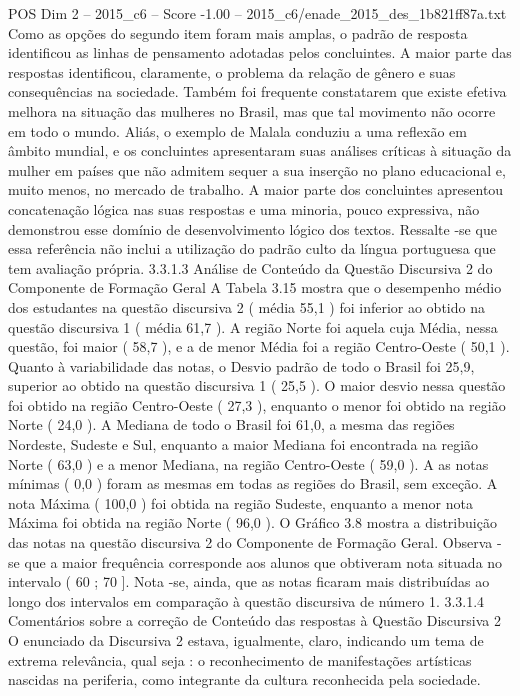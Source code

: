\begin{textsample}{POS Dim 2 – 2015\_c6 – Score -1.00 – 2015\_c6/enade\_2015\_des\_1b821ff87a.txt}
Como as opções do segundo item foram mais amplas, o padrão de resposta identificou as linhas de pensamento adotadas pelos concluintes.
A maior parte das respostas identificou, claramente, o problema da relação de gênero e suas consequências na sociedade.
Também foi frequente constatarem que existe efetiva melhora na situação das mulheres no Brasil, mas que tal movimento não ocorre em todo o mundo.
Aliás, o exemplo de Malala conduziu a uma reflexão em âmbito mundial, e os concluintes apresentaram suas análises críticas à situação da mulher em países que não admitem sequer a sua inserção no plano educacional e, muito menos, no mercado de trabalho.
A maior parte dos concluintes apresentou concatenação lógica nas suas respostas e uma minoria, pouco expressiva, não demonstrou esse domínio de desenvolvimento lógico dos textos.
Ressalte -se que essa referência não inclui a utilização do padrão culto da língua portuguesa que tem avaliação própria. 3.3.1.3 Análise de Conteúdo da Questão Discursiva 2 do Componente de Formação Geral A Tabela 3.15 mostra que o desempenho médio dos estudantes na questão discursiva 2 ( média 55,1 ) foi inferior ao obtido na questão discursiva 1 ( média 61,7 ).
A região Norte foi aquela cuja Média, nessa questão, foi maior ( 58,7 ), e a de menor Média foi a região Centro-Oeste ( 50,1 ).
Quanto à variabilidade das notas, o Desvio padrão de todo o Brasil foi 25,9, superior ao obtido na questão discursiva 1 ( 25,5 ).
O maior desvio nessa questão foi obtido na região Centro-Oeste ( 27,3 ), enquanto o menor foi obtido na região Norte ( 24,0 ).
A Mediana de todo o Brasil foi 61,0, a mesma das regiões Nordeste, Sudeste e Sul, enquanto a maior Mediana foi encontrada na região Norte ( 63,0 ) e a menor Mediana, na região Centro-Oeste ( 59,0 ).
A as notas mínimas ( 0,0 ) foram as mesmas em todas as regiões do Brasil, sem exceção.
A nota Máxima ( 100,0 ) foi obtida na região Sudeste, enquanto a menor nota Máxima foi obtida na região Norte ( 96,0 ).
O Gráfico 3.8 mostra a distribuição das notas na questão discursiva 2 do Componente de Formação Geral.
Observa -se que a maior frequência corresponde aos alunos que obtiveram nota situada no intervalo ( 60 ; 70 ].
Nota -se, ainda, que as notas ficaram mais distribuídas ao longo dos intervalos em comparação à questão discursiva de número 1. 3.3.1.4 Comentários sobre a correção de Conteúdo das respostas à Questão Discursiva 2 O enunciado da Discursiva 2 estava, igualmente, claro, indicando um tema de extrema relevância, qual seja : o reconhecimento de manifestações artísticas nascidas na periferia, como integrante da cultura reconhecida pela sociedade.

\end{textsample}
